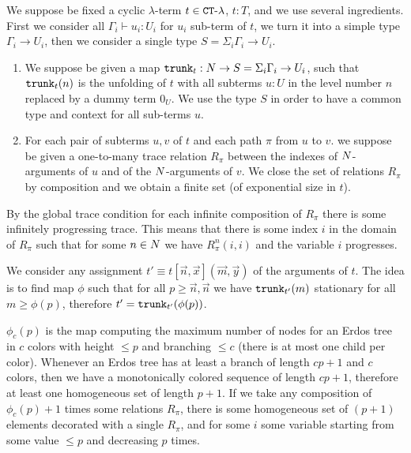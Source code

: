 We suppose be fixed a cyclic $\lambda$-term $t \in { {\tt CT} \mbox{-} \lambda}$, $t : T$,
 and we use several ingredients. First we consider all $\Gamma_i \vdash u_i : U_i$ for $u_i$ sub-term of $t$,
we turn it into a simple type $\Gamma_i \rightarrow U_i$, then we consider a single type
$S = \Sigma_i \Gamma_i \rightarrow U_i$. 


\begin{enumerate}
\item
We suppose be given a map ${\tt trunk}_t:{N} \rightarrow S = \Sigma_i \Gamma_i \rightarrow U_i$, 
such that ${\tt trunk}_t(n)$ is 
the unfolding of $t$ with all subterms $u:U$ in the level number $n$ replaced by a dummy term $0_U$.
We use the type $S$ in order to have a common type and context for all sub-terms $u$.

\item
For each pair of subterms $u,v$ of $t$ and each path $\pi$ from $u$ to $v$. 
we suppose be given a one-to-many trace
relation $R_\pi$ between the indexes of ${N}$-arguments of $u$ and of the ${N}$-arguments of $v$. 
We close the set of relations $R_\pi$ by composition 
and we obtain a finite set (of exponential size in $t$).
\end{enumerate}

By the global trace condition for each infinite composition of $R_\pi$ there is some infinitely progressing
trace. This means that there is some index $i$ in the domain of $R_\pi$ such that for some $n \in {N}$
we have $R^n_\pi(i,i)$ and the variable $i$ progresses.


We consider any assignment $t' \equiv t[\vec{n},\vec{x}](\vec{m},\vec{y})$ of the arguments of $t$.
The idea is to find map $\phi$ such that for all $p \ge \vec{n}, \vec{n}$ we have
${\tt trunk}_{t'}(m)$ stationary for all $m \ge \phi(p)$, therefore $t' = {\tt trunk}_{t'}(\phi(p))$.

$\phi_c(p)$ is the map computing the maximum number of nodes for an Erdos tree in $c$
colors with height $\le p$ and branching $\le c$ (there is at most one child per color).
Whenever an Erdos tree has at least a branch of length $cp+1$ and $c$ colors, 
then we have a monotonically colored sequence
of length $cp+1$, therefore at least one homogeneous set of length $p+1$. If we take any composition of 
$\phi_c(p)+1$ times some relations $R_\pi$, there is some homogeneous set of $(p+1)$ elements
decorated with a single $R_\pi$, and for some $i$ some variable starting from some value $\le p$ 
and decreasing $p$ times. 

